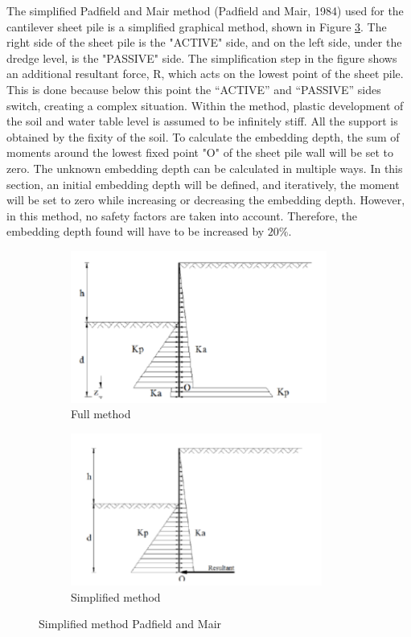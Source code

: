 The simplified Padfield and Mair method (Padfield and Mair, 1984) used for the cantilever sheet pile is a simplified graphical method, shown in Figure \ref{fig:blum}. The right side of the sheet pile is the "ACTIVE" side, and on the left side, under the dredge level, is the "PASSIVE" side. The simplification step in the figure shows an additional resultant force, R, which acts on the lowest point of the sheet pile. This is done because below this point the “ACTIVE” and “PASSIVE” sides switch, creating a complex situation. Within the method, plastic development of the soil and water table level is assumed to be infinitely stiff. All the support is obtained by the fixity of the soil. To calculate the embedding depth, the sum of moments around the lowest fixed point "O" of the sheet pile wall will be set to zero. The unknown embedding depth can be calculated in multiple ways. In this section, an initial embedding depth will be defined, and iteratively, the moment will be set to zero while increasing or decreasing the embedding depth. However, in this method, no safety factors are taken into account. Therefore, the embedding depth found will have to be increased by $20\%$.

\begin{figure}[H]
    \centering
    \begin{subfigure}[b]{0.45\textwidth}
        \includegraphics[width=\linewidth, height=5cm]{figures/ch8/blum_1.png}
        \caption{Full method}
        \label{fig:conventional_design}
    \end{subfigure}
    \hfill
    \begin{subfigure}[b]{0.45\textwidth}
        \includegraphics[width=\linewidth, height=5cm]{figures/ch8/blum_2.png}
        \caption{Simplified method}
        \label{fig:blum_simplification}
    \end{subfigure}
    \caption{Simplified method Padfield and Mair}
    \label{fig:blum}
\end{figure}

